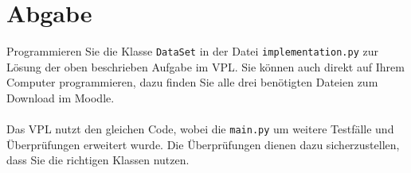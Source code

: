 \documentclass[
12pt,     %
a4paper,     %
parskip=full   %
]{scrartcl}
\begin{document}
    \section{Abgabe}
        Programmieren Sie die Klasse \verb|DataSet| in der Datei \verb|implementation.py| zur Lösung der oben beschrieben Aufgabe im VPL.
        Sie können auch direkt auf Ihrem Computer programmieren, dazu finden Sie alle drei benötigten Dateien zum Download im Moodle.\\
        \\
        Das VPL nutzt den gleichen Code, wobei die \verb|main.py| um weitere Testfälle und Überprüfungen erweitert wurde.
        Die Überprüfungen dienen dazu sicherzustellen, dass Sie die richtigen Klassen nutzen.
\end{document}
